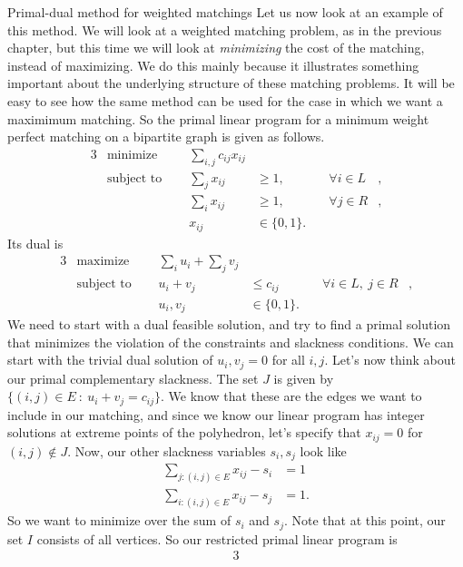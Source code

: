 \documentclass[11pt]{article}
\renewcommand{\'}{^{'}}
\begin{document}
\begin{section}{Primal-dual method for weighted matchings}
	Let us now look at an example of this method. We will look at a weighted matching problem, as 
	in the previous chapter, but this time we will look at \emph{minimizing} the cost of the 
	matching, instead of maximizing. We do this mainly because it illustrates something important 
	about the underlying structure of these matching problems. It will be easy to see how the 
	same method can be used for the case in which we want a maximimum matching. So the primal 
	linear program for a minimum weight perfect matching on a bipartite graph is given as follows. 
	\begin{alignat}{3}
		& \text{minimize } & \sum_{i,j} c_{ij} x_{ij}& \\
		& \text{subject to } \quad & \sum_{j} x_{ij} & \geq 1, & \quad \forall i\in L&, \\
				     &\quad & \sum_{i} x_{ij} & \geq 1, & \quad \forall j\in R &, \\
				&& x_{ij} & \in \{0,1\}.
	\end{alignat}
	Its dual is
	\begin{alignat}{3}
		& \text{maximize } & \sum_{i}u_i + \sum_jv_j& \\
		& \text{subject to } \quad & u_i + v_j & \leq c_{ij} & \quad \forall 
					i\in L,\ j\in R &, \\
				    && u_i,v_j & \in \{0,1\}.
	\end{alignat}
	We need to start with a dual feasible solution, and try to find a primal solution that 
	minimizes the violation of the constraints and slackness conditions. We can start with the 
	trivial dual solution of $u_i,v_j = 0$ for all $i,j$. Let's now think about our primal 
	complementary slackness. The set $J$ is given by $\{(i,j)\in E\ :\ u_i + v_j = c_{ij}\}$. 
	We know that these are the edges we want to include in our matching, and since we know our 
	linear program has integer solutions at extreme points of the polyhedron, let's specify that 
	$x_{ij} = 0$ for $(i,j)\notin J$. Now, our other slackness variables $s_i,s_j$ look like 
	\begin{align*}
		\sum_{j:(i,j)\in E} x_{ij} - s_i &= 1 \\
		\sum_{i:(i,j)\in E} x_{ij} - s_j &= 1.
	\end{align*}
	So we want to minimize over the sum of $s_i$ and $s_j$. Note that at this point, our set $I$ 
	consists of all vertices. So our restricted primal linear program is
	\begin{alignat}{3}

\end{alignat}
\end{section}
\end{document}
